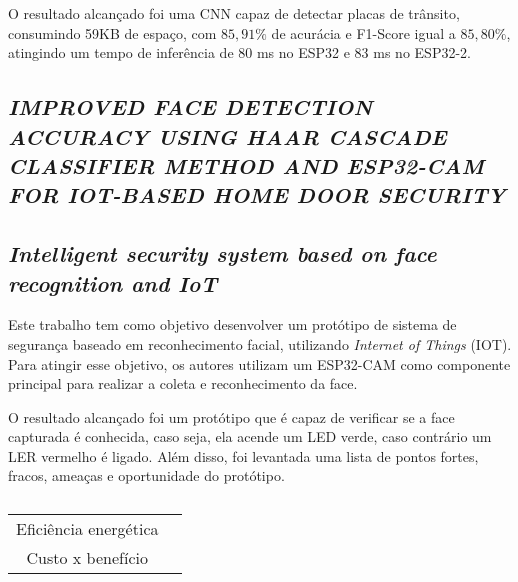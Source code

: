 O resultado alcançado foi uma CNN capaz de detectar placas de trânsito, consumindo 59KB de espaço, com $85,91\%$ de
acurácia e F1-Score igual a $85,80\%$, atingindo um tempo de inferência de 80 ms no ESP32 e 83 ms no ESP32-2.

\subsection{\textit{IMPROVED FACE DETECTION ACCURACY USING HAAR CASCADE CLASSIFIER METHOD AND ESP32-CAM FOR IOT-BASED HOME DOOR SECURITY}}

\subsection{\textit{Intelligent security system based on face recognition and IoT}}
Este trabalho tem como objetivo desenvolver um protótipo de sistema de segurança baseado em reconhecimento facial,
utilizando \textit{Internet of Things} (IOT). Para atingir esse objetivo, os autores utilizam um ESP32-CAM como componente
principal para realizar a coleta e reconhecimento da face.

O resultado alcançado foi um protótipo que é capaz de verificar se a face capturada é conhecida, caso seja, ela acende um
LED verde, caso contrário um LER vermelho é ligado. Além disso, foi levantada uma lista de pontos fortes, fracos, ameaças
e oportunidade do protótipo.

\begin{center}
\begin{table}[htb]
\centering
\ABNTEXfontereduzida
\caption[]{}
\label{tabela_swot}
\begin{tabular}{ |c|c| }
	\hline
	Eficiência energética \\
	Custo x benefício \\
	\hline
\end{tabular}
\legend{}
\end{table}
\end{center}
